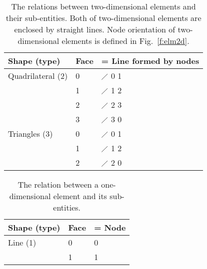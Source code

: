\documentclass[11pt,dvips]{article}
\newcommand{\topcaption}{%
\setlength{\abovecaptionskip}{0pt}%
\setlength{\belowcaptionskip}{10pt}%
\caption}
\numberwithin{equation}{section}
\begin{document}
%
\begin{table}
\centering

\topcaption{
%
The relations between two-dimensional elements and their sub-entities.  Both of
two-dimensional elements are enclosed by straight lines.  Node orientation of
two-dimensional elements is defined in Fig.~\ref{f:elm2d}.
%
}

\label{t:subent2d}
\begin{tabular}{lll}
\toprule
Shape (type)      & Face & = Line formed by nodes \\
\midrule
Quadrilateral (2) & 0    & $\diagup$ 0 1          \\
                  & 1    & $\diagup$ 1 2          \\
                  & 2    & $\diagup$ 2 3          \\
                  & 3    & $\diagup$ 3 0          \\
\midrule
Triangles (3)     & 0    & $\diagup$ 0 1          \\
                  & 1    & $\diagup$ 1 2          \\
                  & 2    & $\diagup$ 2 0          \\
\bottomrule
\end{tabular}
\end{table}
%

%
\begin{table}
\centering

\topcaption{
%
The relation between a one-dimensional element and its sub-entities.
%
}

\label{t:subent1d}
\begin{tabular}{lll}
\toprule
Shape (type) & Face & = Node \\
\midrule
Line (1)     & 0    & 0      \\
             & 1    & 1      \\
\bottomrule
\end{tabular}
\end{table}
%
\end{document}
